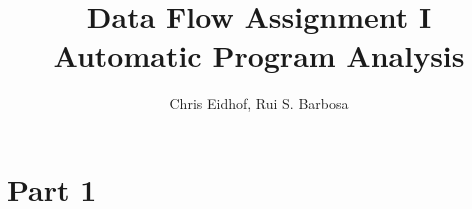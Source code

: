 \documentclass[a4wide,12pt]{article}
\begin{document}
\author{Chris Eidhof, Rui S. Barbosa}
\title{Data Flow Assignment I \\ Automatic Program Analysis}
 
\maketitle
 
\section{Part 1}

\begin{sideways}

\end{sideways}

\newpage

\begin{sideways}

\end{sideways}

\newpage

\begin{sideways}

\end{sideways}

\newpage
\end{document}
